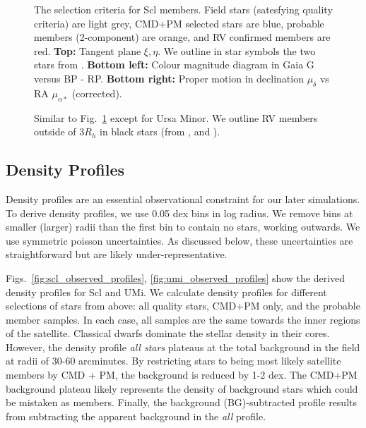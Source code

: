 \begin{figure}
\centering
{}
\caption[Sculptor selection criteria]{The selection criteria for Scl
members. Field stars (satesfying quality criteria) are light grey,
CMD+PM selected stars are blue, probable members (2-component) are
orange, and RV confirmed members are red. \textbf{Top:} Tangent plane
\(\xi, \eta\). We outline in star symbols the two stars from
\citet{sestito+2023a}. \textbf{Bottom left:} Colour magnitude diagram in
Gaia G versus BP - RP. \textbf{Bottom right:} Proper motion in
declination \(\mu_\delta\) vs RA \(\mu_{\alpha*}\)
(corrected).}\label{fig:sculptor_selection}
\end{figure}

\begin{figure}
\centering
{}
\caption[Ursa Minor Selection]{Similar to
Fig.~\ref{fig:sculptor_selection} except for Ursa Minor. We outline RV
members outside of \(3R_h\) in black stars (from \citet{sestito+2023b},
\citet{pace+2020} and \citet{spencer+2018}).}\label{fig:umi_selection}
\end{figure}

\subsection{Density Profiles}\label{density-profiles}

Density profiles are an essential observational constraint for our later
simulations. To derive density profiles, we use 0.05 dex bins in log
radius. We remove bins at smaller (larger) radii than the first bin to
contain no stars, working outwards. We use symmetric poisson
uncertainties. As discussed below, these uncertainties are
straightforward but are likely under-representative.

Figs.~\ref{fig:scl_observed_profiles}, \ref{fig:umi_observed_profiles}
show the derived density profiles for Scl and UMi. We calculate density
profiles for different selections of stars from above: all quality
stars, CMD+PM only, and the probable member samples. In each case, all
samples are the same towards the inner regions of the satellite.
Classical dwarfs dominate the stellar density in their cores. However,
the density profile \emph{all stars} plateaus at the total background in
the field at radii of 30-60 arcminutes. By restricting stars to being
most likely satellite members by CMD + PM, the background is reduced by
1-2 dex. The CMD+PM background plateau likely represents the density of
background stars which could be mistaken as members. Finally, the
background (BG)-subtracted profile results from subtracting the apparent
background in the \emph{all} profile.

